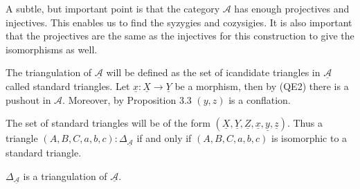     \begin{remark}
        A subtle, but important point is that the category $\mathcal{A}$ has enough projectives and injectives. This enables us to find the syzygies and cozysigies. It is also important that the projectives are the same as the injectives for this construction to give the isomorphisms as well.
    \end{remark}

    The triangulation of $\underline{\mathcal{A}}$ will be defined as the set of icandidate triangles in $\underline{\mathcal{A}}$ called standard triangles. Let $\underline{x}:\underline{X}\rightarrow\underline{Y}$ be a morphism, then by (QE2) there is a pushout in $\mathcal{A}$. Moreover, by Proposition 3.3 $(y,z)$ is a conflation.

    \begin{minipage}[c]{0.6\textwidth}
        \begin{center}
        \end{center}
    \end{minipage}
    \begin{minipage}[c]{0.4\textwidth}
        The set of standard triangles will be of the form $(\underline{X},\underline{Y},\underline{Z},\underline{x},\underline{y},\underline{z})$. Thus a triangle $(A,B,C,a,b,c):\Delta_{\underline{\mathcal{A}}}$ if and only if $(A,B,C,a,b,c)$ is isomorphic to a standard triangle.
    \end{minipage}

    \begin{prop}
        $\Delta_{\underline{\mathcal{A}}}$ is a triangulation of $\underline{\mathcal{A}}$.
    \end{prop}

